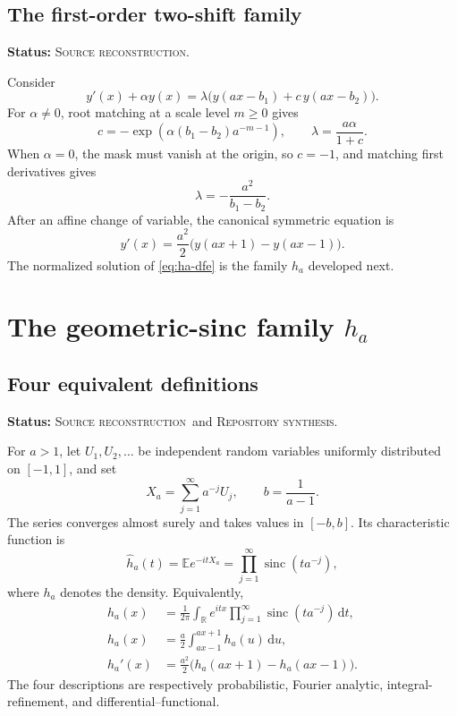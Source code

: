 \documentclass[11pt,oneside]{article}
\theoremstyle{definition}
\theoremstyle{remark}
\newcommand{\sinc}{\operatorname{sinc}}
\newcommand{\E}{\mathbb{E}}
\newcommand{\R}{\mathbb{R}}
\newcommand{\dd}{\,\mathrm{d}}
\newcommand{\SourceStatus}{\textcolor{SourceBlue}{\textsc{Source reconstruction}}}
\newcommand{\RepoStatus}{\textcolor{RepoOlive}{\textsc{Repository synthesis}}}
\newcommand{\status}[1]{\par\smallskip\noindent\textbf{Status:} #1.\par\smallskip}
\begin{document}
\subsection{The first-order two-shift family}
\status{\SourceStatus}

Consider
\begin{equation}
  y'(x)+\alpha y(x)=\lambda\bigl(y(ax-b_1)+c\,y(ax-b_2)\bigr).
  \label{eq:first-order-family}
\end{equation}
For \(\alpha\ne0\), root matching at a scale level \(m\ge0\) gives
\begin{equation}
  c=-\exp\!\left(\alpha(b_1-b_2)a^{-m-1}\right),
  \qquad
  \lambda=\frac{a\alpha}{1+c}.
  \label{eq:first-order-params}
\end{equation}
When \(\alpha=0\), the mask must vanish at the origin, so \(c=-1\), and matching first derivatives gives
\begin{equation}
  \lambda=-\frac{a^2}{b_1-b_2}.
  \label{eq:first-order-alpha-zero}
\end{equation}
After an affine change of variable, the canonical symmetric equation is
\begin{equation}
  y'(x)=\frac{a^2}{2}\bigl(y(ax+1)-y(ax-1)\bigr).
  \label{eq:ha-dfe}
\end{equation}
The normalized solution of \eqref{eq:ha-dfe} is the family \(h_a\) developed next.

\section{The geometric-sinc family \texorpdfstring{\(h_a\)}{h-a}}
\label{sec:ha}

\subsection{Four equivalent definitions}
\status{\SourceStatus\ and \RepoStatus}

For \(a>1\), let \(U_1,U_2,\ldots\) be independent random variables uniformly distributed on \([-1,1]\), and set
\begin{equation}
  X_a=\sum_{j=1}^{\infty}a^{-j}U_j,
  \qquad b=\frac1{a-1}.
  \label{eq:Xa}
\end{equation}
The series converges almost surely and takes values in \([-b,b]\).  Its characteristic function is
\begin{equation}
  \widehat h_a(t)=\E e^{-itX_a}
   =\prod_{j=1}^{\infty}\sinc(ta^{-j}),
  \label{eq:ha-fourier}
\end{equation}
where \(h_a\) denotes the density.  Equivalently,
\begin{align}
 h_a(x)&=\frac1{2\pi}\int_{\R}e^{itx}
    \prod_{j=1}^{\infty}\sinc(ta^{-j})\dd t,
    \label{eq:ha-inverse-fourier}\\
 h_a(x)&=\frac a2\int_{ax-1}^{ax+1}h_a(u)\dd u,
    \label{eq:ha-fixed-point}\\
 h_a'(x)&=\frac{a^2}{2}\bigl(h_a(ax+1)-h_a(ax-1)\bigr).
    \label{eq:ha-derivative}
\end{align}
The four descriptions are respectively probabilistic, Fourier analytic, integral-refinement, and differential--functional.
\end{document}
